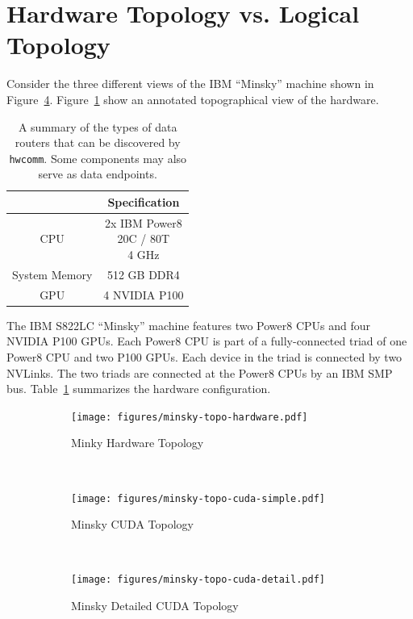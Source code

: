 \section{Hardware Topology vs. Logical Topology}

Consider the three different views of the IBM ``Minsky'' machine shown in Figure~\ref{fig:minsky-hardware-logical}.
Figure~\ref{fig:minsky-topo-hardware} show an annotated topographical view of the hardware.

\begin{table}[]
    \centering
    \caption[Discoverable vertex types]{
        A summary of the types of data routers that can be discovered by \texttt{hwcomm}.
        Some components may also serve as data endpoints.
        }
    \label{tab:minsky}
    \begin{tabular}{|c|c|}
    \hline
    \textbf{} & \textbf{Specification}                  \\ \hline
    CPU               &  \makecell{2x IBM Power8 \\ 20C / 80T \\ 4 GHz}  \\ \hline
    System Memory     &  512 GB DDR4                          \\ \hline
    GPU               &  4 NVIDIA P100                        \\ \hline
    \end{tabular}
\end{table}

The IBM S822LC ``Minsky'' machine features two Power8 CPUs and four NVIDIA P100 GPUs.
Each Power8 CPU is part of a fully-connected triad of one Power8 CPU and two P100 GPUs.
Each device in the triad is connected by two NVLinks.
The two triads are connected at the Power8 CPUs by an IBM SMP bus.
Table~\ref{tab:minsky} summarizes the hardware configuration.


\begin{figure}[ht]
    \centering
    \begin{subfigure}[b]{0.3\textwidth}
        \texttt{[image: figures/minsky-topo-hardware.pdf]}
        \caption{Minky Hardware Topology}
        \label{fig:minsky-topo-hardware}
    \end{subfigure}
    ~
    \begin{subfigure}[b]{0.3\textwidth}
        \texttt{[image: figures/minsky-topo-cuda-simple.pdf]}
        \caption{Minsky CUDA Topology}
        \label{fig:fig:minsky-topo-cuda-simple}
    \end{subfigure}
    ~
    \begin{subfigure}[b]{0.3\textwidth}
        \texttt{[image: figures/minsky-topo-cuda-detail.pdf]}
        \caption{Minsky Detailed CUDA Topology}
        \label{fig:fig:minsky-topo-cuda-detail}
    \end{subfigure}
    \caption[]{}
    \label{fig:minsky-hardware-logical}
\end{figure}


